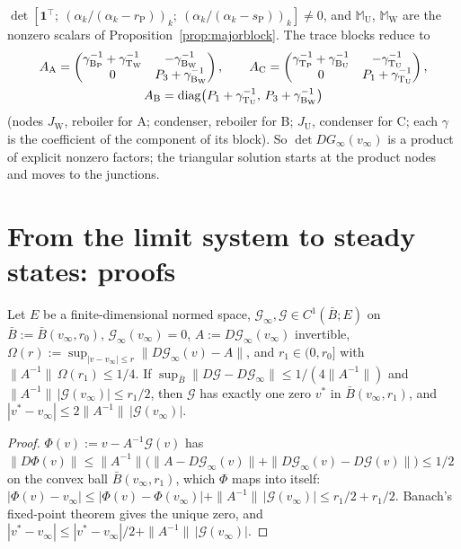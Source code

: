 \documentclass[11pt,a4paper]{report}
\newcommand{\one}{\mathbf 1}
\newcommand{\Ts}{\mathrm T}
\newcommand{\Bs}{\mathrm B}
\newcommand{\Mm}{\mathbb M}
\begin{document}
\begin{example}[\(N=3\), pattern \((\Bs,\Ts)\)]
\(\det[\one^\top;\ (\alpha_k/(\alpha_k-r_{\mathrm P}))_k;\ (\alpha_k/(\alpha_k-s_{\mathrm P}))_k]\ne0\), and \(\Mm_{\mathrm U}\), \(\Mm_{\mathrm W}\) are the nonzero
scalars of Proposition~\ref{prop:majorblock}. The trace blocks reduce to
\begin{gather*}
A_{\mathrm A}=\begin{pmatrix}\gamma_{\Bs_{\mathrm P}}^{-1}+\gamma_{\Ts_{\mathrm W}}^{-1}&-\gamma_{\Bs_{\mathrm W}}^{-1}\\0&P_3+\gamma_{\Bs_{\mathrm W}}^{-1}\end{pmatrix},\qquad
A_{\mathrm C}=\begin{pmatrix}\gamma_{\Ts_{\mathrm P}}^{-1}+\gamma_{\Bs_{\mathrm U}}^{-1}&-\gamma_{\Ts_{\mathrm U}}^{-1}\\0&P_1+\gamma_{\Ts_{\mathrm U}}^{-1}\end{pmatrix},\\
A_{\mathrm B}=\diag\bigl(P_1+\gamma_{\Ts_{\mathrm U}}^{-1},\,P_3+\gamma_{\Bs_{\mathrm W}}^{-1}\bigr)
\end{gather*}
(nodes \(J_{\mathrm W}\), reboiler for A; condenser, reboiler for B; \(J_{\mathrm U}\), condenser for C; each \(\gamma\) is the coefficient of the
component of its block). So \(\det DG_\infty(v_\infty)\) is a product of explicit nonzero factors; the triangular solution starts at the
product nodes and moves to the junctions.
\end{example}

\section{From the limit system to steady states: proofs}\label{app:analysis}

\begin{lemma}\label{lem:ift}
Let \(E\) be a finite-dimensional normed space, \(\mathcal G_\infty,\mathcal G\in C^1(\bar B;E)\) on \(\bar B:=\bar B(v_\infty,r_0)\),
\(\mathcal G_\infty(v_\infty)=0\), \(A:=D\mathcal G_\infty(v_\infty)\) invertible,
\(\Omega(r):=\sup_{|v-v_\infty|\le r}\|D\mathcal G_\infty(v)-A\|\), and \(r_1\in(0,r_0]\) with \(\|A^{-1}\|\,\Omega(r_1)\le1/4\). If
\(\sup_{\bar B}\|D\mathcal G-D\mathcal G_\infty\|\le1/(4\|A^{-1}\|)\) and \(\|A^{-1}\|\,|\mathcal G(v_\infty)|\le r_1/2\), then \(\mathcal G\) has exactly one zero
\(v^*\) in \(\bar B(v_\infty,r_1)\), and \(|v^*-v_\infty|\le2\|A^{-1}\|\,|\mathcal G(v_\infty)|\).
\end{lemma}
\begin{proof}
\(\Phi(v):=v-A^{-1}\mathcal G(v)\) has \(\|D\Phi(v)\|\le\|A^{-1}\|\bigl(\|A-D\mathcal G_\infty(v)\|+\|D\mathcal G_\infty(v)-D\mathcal G(v)\|\bigr)\le1/2\) on the
convex ball \(\bar B(v_\infty,r_1)\), which \(\Phi\) maps into itself:
\(|\Phi(v)-v_\infty|\le|\Phi(v)-\Phi(v_\infty)|+\|A^{-1}\|\,|\mathcal G(v_\infty)|\le r_1/2+r_1/2\). Banach's fixed-point theorem gives the unique zero,
and \(|v^*-v_\infty|\le|v^*-v_\infty|/2+\|A^{-1}\|\,|\mathcal G(v_\infty)|\).
\end{proof}
\end{document}
